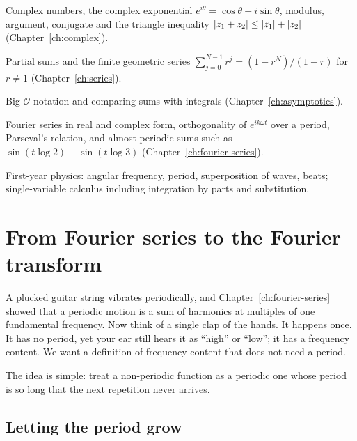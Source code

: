 \begin{prerequisites}

\item Complex numbers, the complex exponential $e^{i\theta}=\cos\theta+i\sin\theta$, modulus, argument, conjugate and the triangle inequality $\left\lvert z_1+z_2\right\rvert\le\left\lvert z_1\right\rvert+\left\lvert z_2\right\rvert$ (Chapter~\ref{ch:complex}).
\item Partial sums and the finite geometric series $\sum_{j=0}^{N-1}r^j=(1-r^N)/(1-r)$ for $r\neq1$ (Chapter~\ref{ch:series}).
\item Big-$\mathcal O$ notation and comparing sums with integrals (Chapter~\ref{ch:asymptotics}).
\item Fourier series in real and complex form, orthogonality of $e^{ik\omega t}$ over a period, Parseval's relation, and almost periodic sums such as $\sin(t\log2)+\sin(t\log3)$ (Chapter~\ref{ch:fourier-series}).
\item First-year physics: angular frequency, period, superposition of waves, beats; single-variable calculus including integration by parts and substitution.

\end{prerequisites}

\section{From Fourier series to the Fourier transform}\label{sec:fourier-transform-def}

A plucked guitar string vibrates periodically, and Chapter~\ref{ch:fourier-series} showed that a periodic motion is a sum of harmonics at multiples of one fundamental frequency. Now think of a single clap of the hands. It happens once. It has no period, yet your ear still hears it as ``high'' or ``low''; it has a frequency content. We want a definition of frequency content that does not need a period.

The idea is simple: treat a non-periodic function as a periodic one whose period is so long that the next repetition never arrives.

\subsection{Letting the period grow}

